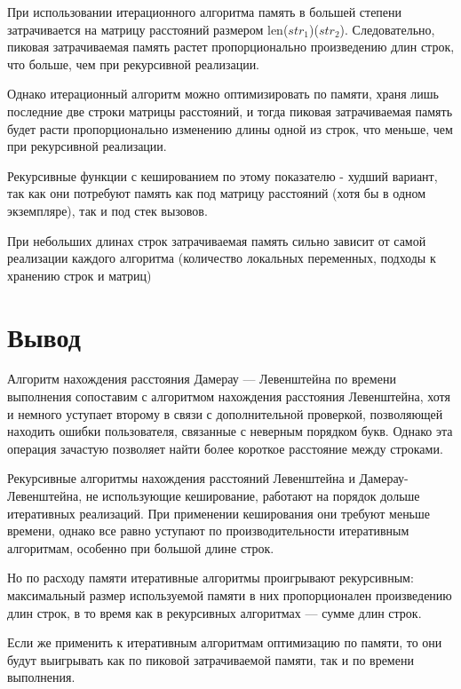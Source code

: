 При использовании итерационного алгоритма память в большей степени затрачивается на матрицу расстояний размером len($str_1$)\timeslen($str_2$). Следовательно, пиковая затрачиваемая память растет пропорционально произведению длин строк, что больше, чем при рекурсивной реализации.

Однако итерационный алгоритм можно оптимизировать по памяти, храня лишь последние две строки матрицы расстояний, и тогда пиковая затрачиваемая память будет расти пропорционально изменению длины одной из строк, что меньше, чем при рекурсивной реализации.

Рекурсивные функции с кешированием по этому показателю - худший вариант, так как они потребуют память как под матрицу расстояний (хотя бы в одном экземпляре), так и под стек вызовов.

При небольших длинах строк затрачиваемая память сильно зависит от самой реализации каждого алгоритма (количество локальных переменных, подходы к хранению строк и матриц)

\section*{Вывод}

Алгоритм нахождения расстояния Дамерау — Левенштейна по времени выполнения сопоставим с алгоритмом нахождения расстояния Левенштейна, хотя и немного уступает второму в связи с дополнительной проверкой, позволяющей находить ошибки пользователя, связанные с неверным порядком букв. Однако эта операция зачастую позволяет найти более короткое расстояние между строками.

Рекурсивные алгоритмы нахождения расстояний Левенштейна и Дамерау-Левенштейна, не использующие кеширование, работают на порядок дольше итеративных реализаций. При применении кеширования они требуют меньше времени, однако все равно уступают по производительности итеративным алгоритмам, особенно при большой длине строк. 

Но по расходу памяти итеративные алгоритмы проигрывают рекурсивным: максимальный размер используемой памяти в них пропорционален произведению длин строк, в то время как в рекурсивных алгоритмах — сумме длин строк.

Если же применить к итеративным алгоритмам оптимизацию по памяти, то они будут выигрывать как по пиковой затрачиваемой памяти, так и по времени выполнения.
